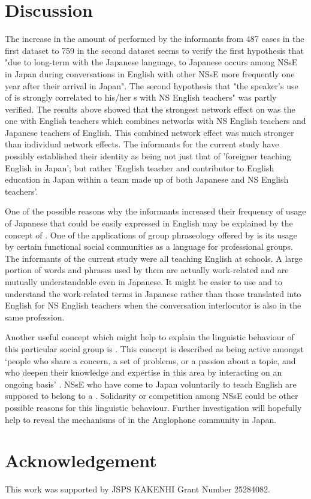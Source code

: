 \documentclass[output=paper]{LSP/langsci}
\begin{document}
\section{Discussion}
The increase in the amount of  performed by the informants from 487 cases in the first dataset to 759 in the second dataset seems to verify the first hypothesis that "due to long-term  with the Japanese language,  to Japanese occurs among NSsE in Japan during conversations in English with other NSsE more frequently one year after their arrival in Japan". The second hypothesis that "the speaker’s use of  is strongly correlated to his/her s with NS English teachers" was partly verified. The results above showed that the strongest network effect on  was the one with English teachers which combines networks with NS English teachers and Japanese teachers of English. This combined network effect was much stronger than individual network effects. The informants for the current study have possibly established their identity as being not just that of 'foreigner teaching English in Japan'; but rather 'English teacher and contributor to English education in Japan within a team made up of both Japanese and NS English teachers'.

One of the possible reasons why the informants increased their frequency of usage of Japanese that could be easily expressed in English may be explained by the concept of . One of the applications of group phraseology offered by \citet[8]{yonekawa_shudango_2009} is its usage by certain functional social communities as a language for professional groups. The informants of the current study were all teaching English at schools. A large portion of words and phrases used by them are actually work-related and are mutually understandable even in Japanese. It might be easier to use and to understand the work-related terms in Japanese rather than those translated into English for NS English teachers when the conversation interlocutor is also in the same profession.

Another useful concept which might help to explain the linguistic behaviour of this particular social group is  \citep{eckert_adolescent_1988}. This concept is described as being active amongst ‘people who share a concern, a set of problems, or a passion about a topic, and who deepen their knowledge and expertise in this area by interacting on an ongoing basis’ \citep[4]{wenger_cultivating_2002}. NSsE who have come to Japan voluntarily to teach English are supposed to belong to a . Solidarity or competition among NSsE could be other possible reasons for this linguistic behaviour. Further investigation will hopefully help to reveal the mechanisms of  in the Anglophone community in Japan.

\section*{Acknowledgement}
This work was supported by JSPS KAKENHI Grant Number 25284082.

\printbibliography[heading=subbibliography,notkeyword=this]
\end{document}
